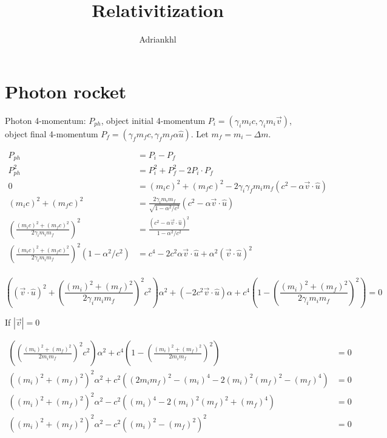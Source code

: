 \documentclass[12pt, letterpaper]{article}
\title{Relativitization}
\author{Adriankhl}
\begin{document}
\begin{titlepage}
\maketitle
\end{titlepage}

\section{Photon rocket}

Photon 4-momentum: $P_{ph}$, object initial 4-momentum $P_i = (\gamma_i m_i c, \gamma_i m_i \overrightarrow{v}) $,
object final 4-momentum $P_f = (\gamma_f m_f c, \gamma_f m_f \alpha \hat{u})$. Let $m_f = m_i - \Delta m$.

\begin{align*}
  P_{ph} &= P_i - P_f \\
  P_{ph}^2 &= P_i^2 + P_f^2 - 2 P_i \cdot P_f \\
  0 &= (m_i c)^2 + (m_f c)^2 - 2 \gamma_i \gamma_f m_i m_f ( c^2 - \alpha \overrightarrow{v} \cdot \hat{u}) \\
  (m_i c)^2 + (m_f c)^2 &= \frac{2 \gamma_i m_i m_f}{\sqrt{1 - \alpha^2 / c^2}} ( c^2 - \alpha \overrightarrow{v} \cdot \hat{u}) \\
  \left(\frac{(m_i c)^2 + (m_f c)^2}{2 \gamma_i m_i m_f}\right)^2 &= \frac{(c^2 - \alpha \overrightarrow{v} \cdot \hat{u})^2}{1 - \alpha^2 / c^2} \\
  \left(\frac{(m_i c)^2 + (m_f c)^2}{2 \gamma_i m_i m_f}\right)^2 (1 - \alpha^2 / c^2) &= c^4 - 2 c^2 \alpha \overrightarrow{v} \cdot \hat{u} + \alpha^2 (\overrightarrow{v} \cdot \hat{u})^2 \\
\end{align*}

\begin{equation*}
  ((\overrightarrow{v} \cdot \hat{u})^2 + \left(\frac{(m_i)^2 + (m_f)^2}{2 \gamma_i m_i m_f}\right)^2 c^2) \alpha ^2 + (- 2 c^2 \overrightarrow{v} \cdot \hat{u}) \alpha + c^4 \left(1 - \left(\frac{(m_i)^2 + (m_f)^2}{2 \gamma_i m_i m_f}\right)^2 \right) = 0
\end{equation*}

If $|\overrightarrow{v}| = 0$

\begin{align*}
  (\left(\frac{(m_i)^2 + (m_f)^2}{2 m_i m_f}\right)^2 c^2) \alpha^2 + c^4 \left(1 - \left(\frac{(m_i)^2 + (m_f)^2}{2 m_i m_f}\right)^2 \right) &= 0 \\
  ((m_i)^2 + (m_f)^2)^2 \alpha^2 + c^2 ((2 m_i m_f)^2 - (m_i)^4 - 2 (m_i)^2 (m_f)^2 - (m_f)^4) &= 0 \\
  ((m_i)^2 + (m_f)^2)^2 \alpha^2 - c^2 ((m_i)^4 - 2 (m_i)^2 (m_f)^2 + (m_f)^4) &= 0 \\
  ((m_i)^2 + (m_f)^2)^2 \alpha^2 - c^2 ((m_i)^2 - (m_f)^2)^2 &= 0
\end{align*}
\end{document}

